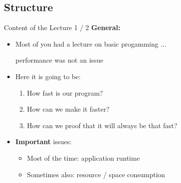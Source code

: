 \subsection{Structure}

\begin{frame}{Content of the Lecture 1 / 2}
  \textbf{General:}
  \begin{itemize}
    \item
      Most of you had a lecture on basic progamming $\ldots$
      \begin{center}\color{MainA}performance was not an issue\end{center}
      \vspace{1em}
    \item<2- | handout: 1>
      Here it is going to be:
      \begin{enumerate}
        \item<3- | handout: 1>
          How fast is our program?
        \item<4- | handout: 1>
          How can we make it faster?
        \item<5- | handout: 1>
          How can we proof that it will always be that fast?
      \end{enumerate}
      \vspace{1em}
    \item<6- |handout:1>
      \textbf{Important} issues:
      \begin{itemize}
        \item
          Most of the time: application {\color{MainA}runtime}
        \item
          Sometimes also: resource / {\color{MainA}space consumption}
      \end{itemize}
  \end{itemize}
\end{frame}


